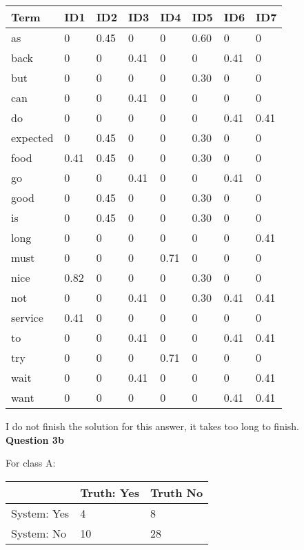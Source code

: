 \documentclass[11pt,a4paper]{report}
\begin{document}
\begin{multicols*}{2}
\scriptsize
\begin{center}
\begin{tabular}{| l | l l l l l l l |}
\hline
Term     & ID1  & ID2  & ID3  & ID4  & ID5  & ID6  & ID7 \\ \hline
as       & 0    & 0.45 & 0    & 0    & 0.60 & 0    & 0   \\
back     & 0    & 0    & 0.41 & 0    & 0    & 0.41 & 0   \\
but      & 0    & 0    & 0    & 0    & 0.30 & 0    & 0   \\
can      & 0    & 0    & 0.41 & 0    & 0    & 0    & 0   \\
do       & 0    & 0    & 0    & 0    & 0    & 0.41 & 0.41\\
expected & 0    & 0.45 & 0    & 0    & 0.30 & 0    & 0   \\
food     & 0.41 & 0.45 & 0    & 0    & 0.30 & 0    & 0   \\
go       & 0    & 0    & 0.41 & 0    & 0    & 0.41 & 0   \\
good     & 0    & 0.45 & 0    & 0    & 0.30 & 0    & 0   \\
is       & 0    & 0.45 & 0    & 0    & 0.30 & 0    & 0   \\
long     & 0    & 0    & 0    & 0    & 0    & 0    & 0.41\\
must     & 0    & 0    & 0    & 0.71 & 0    & 0    & 0   \\
nice     & 0.82 & 0    & 0    & 0    & 0.30 & 0    & 0   \\
not      & 0    & 0    & 0.41 & 0    & 0.30 & 0.41 & 0.41\\
service  & 0.41 & 0    & 0    & 0    & 0    & 0    & 0   \\
to       & 0    & 0    & 0.41 & 0    & 0    & 0.41 & 0.41\\
try      & 0    & 0    & 0    & 0.71 & 0    & 0    & 0   \\
wait     & 0    & 0    & 0.41 & 0    & 0    & 0    & 0.41\\
want     & 0    & 0    & 0    & 0    & 0    & 0.41 & 0.41\\ \hline
\end{tabular}
\end{center}
\normalsize

\noindent I do not finish the solution for this answer, it takes too long to finish. \\

\noindent \textbf{Question 3b}

\noindent For class A:
\begin{center}
\begin{tabular}{| l | l | l |}
\hline
             & Truth: Yes & Truth No \\ \hline
System: Yes  & 4  & 8 \\ \hline
System: No   & 10 & 28\\ \hline
\end{tabular}
\end{center}


\end{multicols*}
\end{document}
